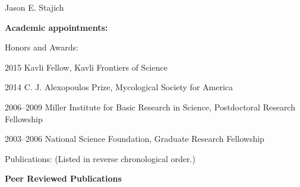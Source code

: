 \documentclass[10pt]{article}
\def\endthebibliography{\end{etaremune}}
\begin{document}
\begin{cv}{\centerline{Jason E. Stajich}}
\begin{cvlistcompact}{\bf Academic appointments:}
\end{cvlistcompact}

\begin{cvlistcompact}{Honors and Awards:}
\item [2015] Kavli Fellow, Kavli Frontiers of Science
\item [2014] C. J. Alexopoulos Prize, Mycological Society for America
\item [2006--2009] Miller Institute for Basic Research in Science,
  Postdoctoral Research Fellowship
\item [2003--2006] National Science Foundation, Graduate Research Fellowship
\end{cvlistcompact}

\setlength{\oldcvlabelwidth}{\cvlabelwidth}
\setlength{\cvlabelwidth}{1em}
\renewcommand*{\bibindent}{1.5em}
\renewcommand*{\biblabelsep}{1.5em}

\begin{cvlist}{Publications: (Listed in reverse chronological order.)}
  \item \textbf{Peer Reviewed Publications}

\makeatletter
\def\thebibliography#1{\list
{\arabic{enumiv}.}{\settowidth\labelwidth{[#1]}\leftmargin\labelwidth
\advance\leftmargin\labelsep
\usecounter{enumiv}}
\def\newblock{\hskip .11em plus .33em minus .07em}
\sloppy\clubpenalty4000\widowpenalty4000
\sfcode`\.=1000\relax
}
\let\endthebibliography=\endlist
\makeatother


\def\mybibitem#1{\item}


\end{cvlist}
\end{cv}
\end{document}
